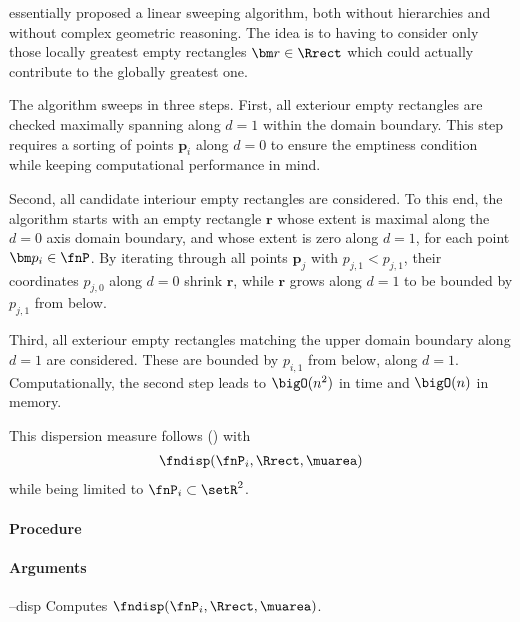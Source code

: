 
 essentially proposed a linear sweeping algorithm, both without hierarchies and without complex geometric reasoning. The idea is to having to consider only those locally greatest empty rectangles $\bm r \in \Rrect$ which could actually contribute to the globally greatest one. 

The algorithm sweeps in three steps. First, all exteriour empty rectangles are checked maximally spanning along $d=1$ within the domain boundary. This step requires a sorting of points $\bm p_i$ along $d=0$ to ensure the emptiness condition while keeping computational performance in mind.

Second, all candidate interiour empty rectangles are considered. To this end, the algorithm starts with an empty rectangle $\bm r$ whose extent is maximal along the $d=0$ axis domain boundary, and whose extent is zero along $d=1$, for each point $\bm p_i \in \fnP$. By iterating through all points $\bm p_j$ with $p_{j,1} < p_{j,1}$, their coordinates $p_{j,0}$ along $d=0$ shrink $\bm r$, while $\bm r$ grows along $d=1$ to be bounded by $p_{j,1}$ from below. 

Third, all exteriour empty rectangles matching the upper domain boundary along $d=1$ are considered. These are bounded by $p_{i,1}$ from below, along $d=1$. Computationally, the second step leads to $\bigO(n^2)$ in time and $\bigO(n)$ in memory. 

This dispersion measure follows () with
\begin{align*}
  \fndisp(\fnP_i, \Rrect, \muarea)
\end{align*}
while being limited to $\fnP_i \subset \setR^2$.

\paragraph{Procedure}

\begin{synopsis}
\end{synopsis}

\paragraph{Arguments}

\begin{procarg}{--disp}
  Computes $\fndisp(\fnP_i, \Rrect, \muarea)$.
\end{procarg}


